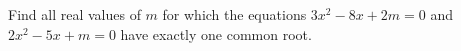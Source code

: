 Find all real values of $m$ for which the equations $3x^2-8x+2m=0$ and $2x^2-5x+m=0$ have exactly one common root.
